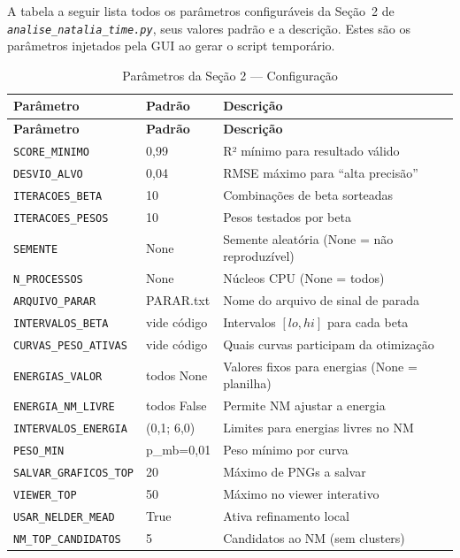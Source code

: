 \documentclass[12pt,a4paper]{report}
\newcommand{\code}[1]{\texttt{#1}}
\newcommand{\arquivo}[1]{\texttt{\itshape #1}}
\begin{document}
A tabela a seguir lista todos os parâmetros configuráveis da Seção~2 de
\arquivo{analise\_natalia\_time.py}, seus valores padrão e a descrição.
Estes são os parâmetros injetados pela GUI ao gerar o script temporário.

\begin{longtable}{lll}
  \caption{Parâmetros da Seção 2 — Configuração} \\
  \toprule
  \textbf{Parâmetro} & \textbf{Padrão} & \textbf{Descrição} \\
  \midrule
  \endfirsthead
  \toprule
  \textbf{Parâmetro} & \textbf{Padrão} & \textbf{Descrição} \\
  \midrule
  \endhead
  \bottomrule
  \endfoot
  \code{SCORE\_MINIMO}       & 0,99  & R² mínimo para resultado válido \\
  \code{DESVIO\_ALVO}        & 0,04  & RMSE máximo para ``alta precisão'' \\
  \code{ITERACOES\_BETA}     & 10    & Combinações de beta sorteadas \\
  \code{ITERACOES\_PESOS}    & 10    & Pesos testados por beta \\
  \code{SEMENTE}             & None  & Semente aleatória (None = não reproduzível) \\
  \code{N\_PROCESSOS}        & None  & Núcleos CPU (None = todos) \\
  \code{ARQUIVO\_PARAR}      & PARAR.txt & Nome do arquivo de sinal de parada \\
  \code{INTERVALOS\_BETA}    & vide código & Intervalos $[lo, hi]$ para cada beta \\
  \code{CURVAS\_PESO\_ATIVAS} & vide código & Quais curvas participam da otimização \\
  \code{ENERGIAS\_VALOR}     & todos None & Valores fixos para energias (None = planilha) \\
  \code{ENERGIA\_NM\_LIVRE}  & todos False & Permite NM ajustar a energia \\
  \code{INTERVALOS\_ENERGIA} & (0,1; 6,0) & Limites para energias livres no NM \\
  \code{PESO\_MIN}           & p\_mb=0,01 & Peso mínimo por curva \\
  \code{SALVAR\_GRAFICOS\_TOP} & 20  & Máximo de PNGs a salvar \\
  \code{VIEWER\_TOP}         & 50   & Máximo no viewer interativo \\
  \code{USAR\_NELDER\_MEAD}  & True & Ativa refinamento local \\
  \code{NM\_TOP\_CANDIDATOS} & 5    & Candidatos ao NM (sem clusters) \\

\end{longtable}
\end{document}
